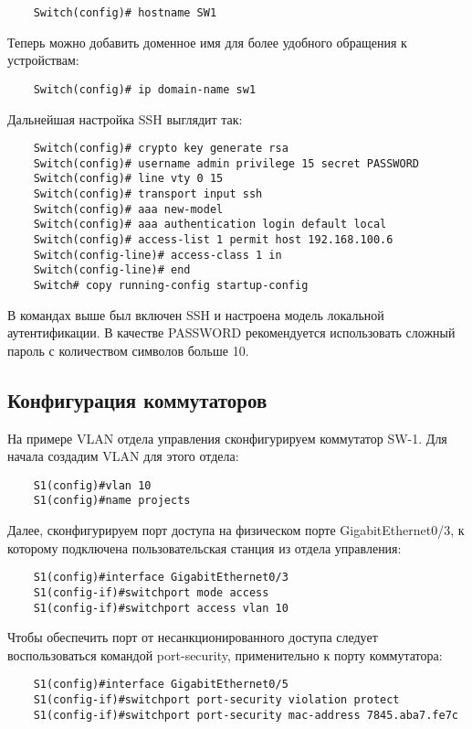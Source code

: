 \begin{lstlisting}
    Switch(config)# hostname SW1
\end{lstlisting}

Теперь можно добавить доменное имя для более удобного обращения к устройствам:

\begin{lstlisting}
    Switch(config)# ip domain-name sw1
\end{lstlisting}

Дальнейшая настройка SSH выглядит так: 

\begin{lstlisting}
    Switch(config)# crypto key generate rsa
    Switch(config)# username admin privilege 15 secret PASSWORD
    Switch(config)# line vty 0 15
    Switch(config)# transport input ssh
    Switch(config)# aaa new-model
    Switch(config)# aaa authentication login default local
    Switch(config)# access-list 1 permit host 192.168.100.6
    Switch(config-line)# access-class 1 in
    Switch(config-line)# end
    Switch# copy running-config startup-config
\end{lstlisting}

В командах выше был включен SSH и настроена модель локальной аутентификации. В качестве PASSWORD рекомендуется 
использовать сложный пароль с количеством символов больше 10. 

\subsection{Конфигурация коммутаторов}

На примере VLAN отдела управления сконфигурируем коммутатор SW-1. Для начала создадим 
VLAN для этого отдела:

\begin{lstlisting}
    S1(config)#vlan 10
    S1(config)#name projects
\end{lstlisting}

Далее, сконфигурируем порт доступа на физическом порте GigabitEthernet0/3, к которому подключена пользовательская
станция из отдела управления:

\begin{lstlisting}
    S1(config)#interface GigabitEthernet0/3
    S1(config-if)#switchport mode access
    S1(config-if)#switchport access vlan 10
\end{lstlisting}

Чтобы обеспечить порт от несанкционированного доступа следует воспользоваться командой port-security, применительно к порту коммутатора:       
\begin{lstlisting}
    S1(config)#interface GigabitEthernet0/5
    S1(config-if)#switchport port-security violation protect
    S1(config-if)#switchport port-security mac-address 7845.aba7.fe7c
\end{lstlisting}

